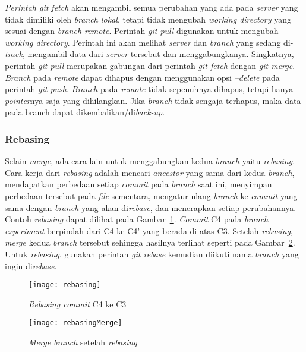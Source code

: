 \textit{Perintah git fetch} akan mengambil semua perubahan yang ada pada \textit{server} yang tidak dimiliki oleh \textit{branch lokal}, tetapi tidak mengubah \textit{working directory} yang sesuai dengan \textit{branch remote}. Perintah \textit{git pull} digunakan untuk mengubah \textit{working directory}. Perintah ini akan melihat \textit{server} dan \textit{branch} yang sedang di-\textit{track}, mengambil data dari \textit{server} tersebut dan menggabungkanya. Singkatnya, perintah \textit{git pull} merupakan gabungan dari perintah \textit{git fetch} dengan \textit{git merge}.\\

\textit{Branch} pada \textit{remote} dapat dihapus dengan menggunakan opsi \textit{--delete} pada perintah \textit{git push}. \textit{Branch} pada \textit{remote} tidak sepenuhnya dihapus, tetapi hanya \textit{pointer}nya saja yang dihilangkan. Jika \textit{branch} tidak sengaja terhapus, maka data pada branch dapat dikembalikan/di\textit{back-up}.

\subsubsection{Rebasing}
Selain \textit{merge}, ada cara lain untuk menggabungkan kedua \textit{branch} yaitu \textit{rebasing}. Cara kerja dari \textit{rebasing} adalah mencari \textit{ancestor} yang sama dari kedua \textit{branch}, mendapatkan perbedaan setiap \textit{commit} pada \textit{branch} saat ini, menyimpan perbedaan tersebut pada \textit{file} sementara, mengatur ulang \textit{branch} ke \textit{commit} yang sama dengan \textit{branch} yang akan di\textit{rebase}, dan menerapkan setiap perubahannya. Contoh \textit{rebasing} dapat dilihat pada Gambar~\ref{fig:rebasing}. \textit{Commit} C4 pada \textit{branch experiment} berpindah dari C4 ke C4' yang berada di atas C3. Setelah \textit{rebasing}, \textit{merge} kedua \textit{branch} tersebut sehingga hasilnya terlihat seperti pada Gambar~\ref{fig:rebasingMerge}. Untuk \textit{rebasing}, gunakan perintah \textit{git rebase} kemudian diikuti nama \textit{branch} yang ingin di\textit{rebase}. 

\begin{figure}[H]
	\centering  
	\texttt{[image: rebasing]}  
	\caption[\textit{Rebasing commit} C4 ke C3]{\textit{Rebasing commit} C4 ke C3}
	\label{fig:rebasing} 
\end{figure}

\begin{figure}[H]
	\centering  
	\texttt{[image: rebasingMerge]}  
	\caption[\textit{Merge branch} setelah \textit{rebasing}]{\textit{Merge branch} setelah \textit{rebasing}}
	\label{fig:rebasingMerge} 
\end{figure}


